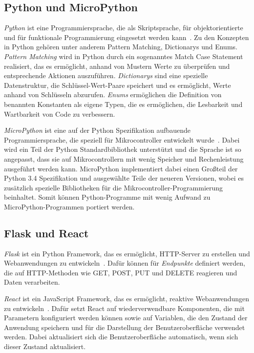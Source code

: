 \subsection*{Python und MicroPython}
\emph{Python} ist eine Programmiersprache, die als Skriptsprache, für objektorientierte und für funktionale Programmierung eingesetzt werden kann~\cite{Python3}.
Zu den Konzepten in Python gehören unter anderem Pattern Matching, Dictionarys und Enums.
\emph{Pattern Matching} wird in Python durch ein sogenanntes Match Case Statement realisiert, das es ermöglicht, anhand von Mustern Werte zu überprüfen und entsprechende Aktionen auszuführen.
\emph{Dictionarys} sind eine spezielle Datenstruktur, die Schlüssel-Wert-Paare speichert und es ermöglicht, Werte anhand von Schlüsseln abzurufen.
\emph{Enums} ermöglichen die Definition von benannten Konstanten als eigene Typen, die es ermöglichen, die Lesbarkeit und Wartbarkeit von Code zu verbessern.

\emph{MicroPython} ist eine auf der Python Spezifikation aufbauende Programmiersprache, die speziell für Mikrocontroller entwickelt wurde~\cite{MicroPython}.
Dabei wird ein Teil der Python Standardbibliothek unterstützt und die Sprache ist so angepasst, dass sie auf Mikrocontrollern mit wenig Speicher und Rechenleistung ausgeführt werden kann.
MicroPython implementiert dabei einen Großteil der Python 3.4 Spezifikation und ausgewählte Teile der neueren Versionen, wobei es zusätzlich spezielle Bibliotheken für die Mikrocontroller-Programmierung beinhaltet.
Somit können Python-Programme mit wenig Aufwand zu MicroPython-Programmen portiert werden.


\subsection*{Flask und React}
\emph{Flask} ist ein Python Framework, das es ermöglicht, HTTP-Server zu erstellen und Webanwendungen zu entwickeln~\cite{Flask}.
Dafür können für \emph{Endpunkte} definiert werden, die auf HTTP-Methoden wie GET, POST, PUT und DELETE reagieren und Daten verarbeiten.

\emph{React} ist ein JavaScript Framework, das es ermöglicht, reaktive Webanwendungen zu entwickeln~\cite{React}.
Dafür setzt React auf wiederverwendbare Komponenten, die mit Parametern konfiguriert werden können sowie auf Variablen, die den Zustand der Anwendung speichern und für die Darstellung der Benutzeroberfläche verwendet werden.
Dabei aktualisiert sich die Benutzeroberfläche automatisch, wenn sich dieser Zustand aktualisiert.


